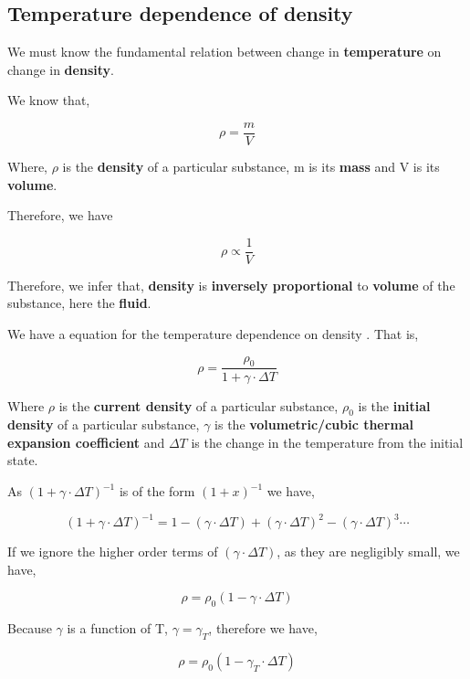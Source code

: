 \subsection{{Temperature dependence of density}}
            
	{We must know the fundamental relation between change in \textbf{temperature} on change in \textbf{density}.}
            
    {We know that,}
    
    		$$\rho = \frac{m}{V}$$
            
	{Where, $\rho$ is the \textbf{density} of a particular substance, m is its \textbf{mass} and V is its \textbf{volume}.}            
          
	{Therefore, we have}          
            
		$$\rho \propto \frac{1}{V}$$            
            
	{Therefore, we infer that, \textbf{density} is \textbf{inversely proportional} to \textbf{volume} of the substance, here the \textbf{fluid}.}            
            
	{We have a equation for the temperature dependence on density \cite{0}. That is,}            
            
		$$\rho = \frac{\rho_{0}}{1 + \gamma\cdot\Delta T}$$            

	{Where $\rho$ is the \textbf{current density} of a particular substance, $\rho_{0}$ is the \textbf{initial density} of a particular substance, $\gamma$ is the \textbf{volumetric/cubic thermal expansion coefficient} and $\Delta T$ is the change in the temperature from the initial state.}            

	{As $\left(1 + \gamma\cdot\Delta T\right)^{-1}$ is of the form $\left(1 + x\right)^{-1}$ we have,}
	
		$$\left(1 + \gamma\cdot\Delta T\right)^{-1} = 1 - \left(\gamma\cdot\Delta T\right) + \left(\gamma\cdot\Delta T\right)^2 - \left(\gamma\cdot\Delta T\right)^3 \cdots$$

	{If we ignore the higher order terms of $\left(\gamma\cdot\Delta T\right)$, as they are negligibly small, we have,}
            
		$$\rho = \rho_{0}\left(1 - \gamma\cdot\Delta T\right)$$            

	{Because $\gamma$ is a function of T, $\gamma = \gamma_{T}$, therefore we have,}

		$$\rho = \rho_{0}\left(1 - \gamma_{T}\cdot\Delta T\right)$$
            
